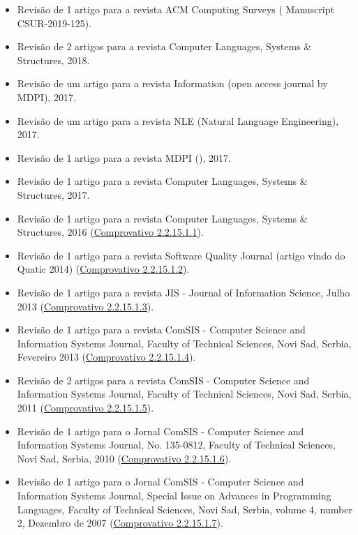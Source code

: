 \documentclass[11pt]{article}
\begin{document}
\begin{itemize}
\item {Revisão de 1 artigo para a revista ACM Computing Surveys ( Manuscript CSUR-2019-125).}
\item {Revisão de 2 artigos para a revista Computer Languages, Systems \& Structures, 2018.}
\item {Revisão de um artigo para a revista Information (open access journal by MDPI), 2017.}
\item {Revisão de um artigo para a revista NLE (Natural Language Engineering), 2017.}
\item {Revisão de 1 artigo para a revista MDPI (), 2017.}
\item {Revisão de 1 artigo para a revista Computer Languages, Systems \& Structures, 2017.}
\item {Revisão de 1 artigo para a revista Computer Languages, Systems \& Structures, 2016 (\href{run:ComprovativosCOCP/revisoes/ComLang2016.pdf}{Comprovativo 2.2.15.1.1}). }
\item {Revisão de 1 artigo para a revista Software Quality Journal (artigo vindo do Quatic 2014) (\href{run:ComprovativosCOCP/revisoes/SQJ2014.pdf}{Comprovativo 2.2.15.1.2}).}
\item {Revisão de 1 artigo para a revista JIS - Journal of Information Science, Julho 2013 (\href{run:ComprovativosCOCP/revisoes/JIS2013.pdf}{Comprovativo 2.2.15.1.3}).}
\item {Revisão de 1 artigo para a revista ComSIS - Computer Science and Information Systems Journal, Faculty of Technical Sciences, Novi Sad, Serbia, Fevereiro 2013 (\href{run:ComprovativosCOCP/revisoes/ComSIS2013.pdf}{Comprovativo 2.2.15.1.4}).}
\item {Revisão de 2 artigos para a revista ComSIS - Computer Science and Information Systems Journal, Faculty of Technical Sciences, Novi Sad, Serbia, 2011 (\href{run:ComprovativosCOCP/revisoes/ComSIS2011.pdf}{Comprovativo 2.2.15.1.5}).}
\item {Revisão de 1 artigo para o Jornal ComSIS - Computer Science and Information Systems Journal, No. 135-0812, Faculty of Technical Sciences, Novi Sad, Serbia, 2010 (\href{run:ComprovativosCOCP/revisoes/ComSIS2010.pdf}{Comprovativo 2.2.15.1.6}).}
\item {Revisão de 1 artigo para o Jornal ComSIS - Computer Science and Information Systems Journal, Special Issue on Advances in Programming Languages, Faculty of Technical Sciences, Novi Sad, Serbia, volume 4, number 2, Dezembro de 2007 (\href{run:ComprovativosCOCP/revisoes/ComSIS2007.pdf}{Comprovativo 2.2.15.1.7}).}
\end{itemize}
\end{document}
